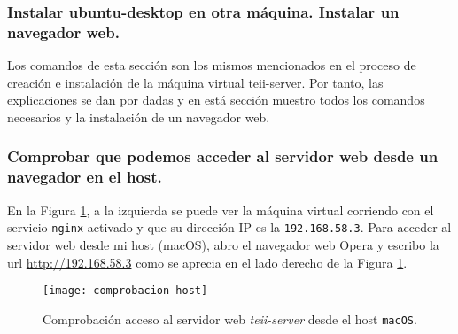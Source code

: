 \subsubsection{Instalar ubuntu-desktop en otra máquina. Instalar un navegador web.}
\par Los comandos de esta sección son los mismos mencionados en el proceso de creación e instalación de la 
máquina virtual teii-server. Por tanto, las explicaciones se dan por dadas y en está sección 
muestro todos los comandos necesarios y la instalación de un navegador web.


\subsubsection{Comprobar que podemos acceder al servidor web desde un navegador en el host.}
\par En la Figura \ref{fig:comprobacion-host}, a la izquierda se puede ver la máquina virtual 
corriendo con el servicio \texttt{nginx} activado y que su dirección IP es la \texttt{192.168.58.3}.
Para acceder al servidor web desde mi host (macOS), abro el navegador web Opera y escribo la url \url{http://192.168.58.3}
como se aprecia en el lado derecho de la Figura \ref{fig:comprobacion-host}.

 \begin{figure}[H]
    \texttt{[image: comprobacion-host]}
    \centering
    \caption{Comprobación acceso al servidor web \textit{teii-server} desde el host \texttt{macOS}.}
    \label{fig:comprobacion-host}
\end{figure}


